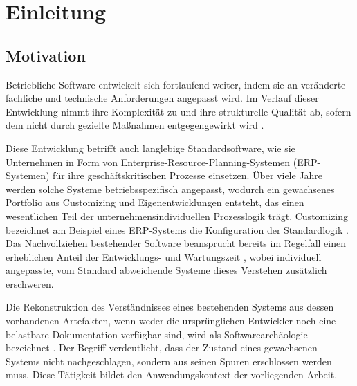 \chapter{Einleitung}
\label{Einleitung}

\section{Motivation}
\label{sec:motivation}

Betriebliche Software entwickelt sich fortlaufend weiter, indem sie an veränderte fachliche und technische Anforderungen angepasst wird. Im Verlauf dieser Entwicklung nimmt ihre Komplexität zu und ihre strukturelle Qualität ab, sofern dem nicht durch gezielte Maßnahmen entgegengewirkt wird \cite{lehman_metrics_1997}.

Diese Entwicklung betrifft auch langlebige Standardsoftware, wie sie Unternehmen in Form von Enterprise-Resource-Planning-Systemen (ERP-Systemen) für ihre geschäftskritischen Prozesse einsetzen. Über viele Jahre werden solche Systeme betriebsspezifisch angepasst, wodurch ein gewachsenes Portfolio aus Customizing und Eigenentwicklungen entsteht, das einen wesentlichen Teil der unternehmensindividuellen Prozesslogik trägt. Customizing bezeichnet am Beispiel eines ERP-Systems die Konfiguration der Standardlogik \cite{brehm_tailoring_2001}. Das Nachvollziehen bestehender Software beansprucht bereits im Regelfall einen erheblichen Anteil der Entwicklungs- und Wartungszeit \cite{xia_measuring_2018}, wobei individuell angepasste, vom Standard abweichende Systeme dieses Verstehen zusätzlich erschweren.

Die Rekonstruktion des Verständnisses eines bestehenden Systems aus dessen vorhandenen Artefakten, wenn weder die ursprünglichen Entwickler noch eine belastbare Dokumentation verfügbar sind, wird als Softwarearchäologie bezeichnet \cite{hunt_software_2002}. Der Begriff verdeutlicht, dass der Zustand eines gewachsenen Systems nicht nachgeschlagen, sondern aus seinen Spuren erschlossen werden muss. Diese Tätigkeit bildet den Anwendungskontext der vorliegenden Arbeit.

